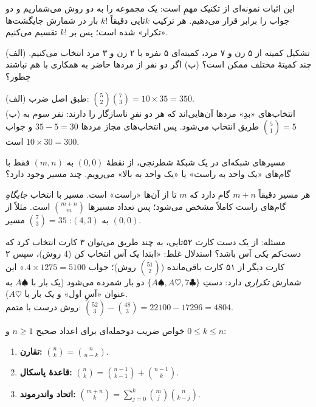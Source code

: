 \begin{intuition}
این اثبات نمونه‌ای از تکنیک مهمِ  است: یک مجموعه را به دو روش می‌شماریم و دو جواب را برابر قرار می‌دهیم. هر ترکیب $k$تایی دقیقاً $k!$ بار در شمارش جایگشت‌ها «تکرار» شده است؛ پس بر $k!$ تقسیم می‌کنیم.
\end{intuition}

\begin{example}{تشکیل کمیته}
از ۵ زن و ۷ مرد، کمیته‌ای ۵ نفره با ۲ زن و ۳ مرد انتخاب می‌کنیم. (الف) چند کمیتهٔ مختلف ممکن است؟ (ب) اگر دو نفر از مردها حاضر به همکاری با هم نباشند چطور؟
\begin{solution}
(الف) طبق اصل ضرب: $\binom52\binom73=10\times35=350$.\\
(ب) انتخاب‌های «بدِ» مردها آن‌هایی‌اند که هر دو نفرِ ناسازگار را دارند: نفر سوم به $\binom51=5$ طریق انتخاب می‌شود. پس انتخاب‌های مجاز مردها $35-5=30$ و جواب $10\times30=300$ است.
\end{solution}
\end{example}

\begin{example}{مسیرهای شبکه‌ای}
در یک شبکهٔ شطرنجی، از نقطهٔ $(0,0)$ به $(m,n)$ فقط با گام‌های «یک واحد به راست» یا «یک واحد به بالا» می‌رویم. چند مسیر وجود دارد؟
\begin{solution}
هر مسیر دقیقاً $m+n$ گام دارد که $m$ تا از آن‌ها «راست» است. مسیر با انتخاب \emph{جایگاهِ} گام‌های راست کاملاً مشخص می‌شود؛ پس تعداد مسیرها $\binom{m+n}{m}$ است. مثلاً از $(0,0)$ به $(4,3)$: $\binom73=35$ مسیر.
\end{solution}
\end{example}

\begin{warning}
مسئله: از یک دست کارت ۵۲تایی، به چند طریق می‌توان ۳ کارت انتخاب کرد که \emph{دست‌کم یکی} آس باشد؟
استدلال غلط: «ابتدا یک آس انتخاب کن ($4$ روش)، سپس ۲ کارت دیگر از ۵۱ کارت باقی‌مانده ($\binom{51}{2}$ روش)؛ جواب $4\times1275=5100$.» این شمارش \emph{تکراری} دارد: دستِ $\{A\spadesuit, A\heartsuit, 7\clubsuit\}$ دو بار شمرده می‌شود (یک بار با $A\spadesuit$ به عنوان «آسِ اول» و یک بار با $A\heartsuit$).\\
روش درست با متمم: $\binom{52}{3}-\binom{48}{3}=22100-17296=4804$.
\end{warning}

\begin{theorem}[label=thm:binom-props]{خواص ضریب دوجمله‌ای}
برای اعداد صحیح $n\ge1$ و $0\le k\le n$:
\begin{enumerate}
  \item \textbf{تقارن:} $\binom nk=\binom n{n-k}$.
  \item \textbf{قاعدهٔ پاسکال:} $\binom nk=\binom{n-1}{k-1}+\binom{n-1}{k}$.
  \item \textbf{اتحاد واندرموند:} $\displaystyle\binom{m+n}{k}=\sum_{j=0}^{k}\binom mj\binom n{k-j}$.
\end{enumerate}
\end{theorem}


